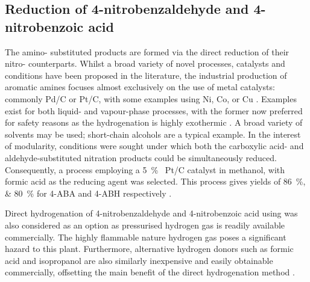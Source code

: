 
\subsection{Reduction of 4-nitrobenzaldehyde and 4-nitrobenzoic acid}

The amino- substituted products are formed via the direct reduction of their nitro- counterparts. Whilst a broad variety of novel processes, catalysts and conditions have been proposed in the literature, the industrial production of aromatic amines focuses almost exclusively on the use of metal catalysts: commonly Pd/C or Pt/C, with some examples using Ni, Co, or Cu \cite{vogt_amines_2000,cartolano_amines_2004}. Examples exist for both liquid- and vapour-phase processes, with the former now preferred for safety reasons as the hydrogenation is highly exothermic \cite{vogt_amines_2000}. A broad variety of solvents may be used; short-chain alcohols are a typical example. In the interest of modularity, conditions were sought under which both the carboxylic acid- and aldehyde-substituted nitration products could be simultaneously reduced. Consequently, a process employing a \SI{5}{\percent\ww} Pt/C catalyst in methanol, with formic acid as the reducing agent was selected. This process gives yields of \SIlist{86;80}{\percent} for 4-ABA and 4-ABH respectively \cite{gowda_catalytic_2000}.

Direct hydrogenation of 4-nitrobenzaldehyde and 4-nitrobenzoic acid using  was also considered as an option as pressurised hydrogen gas is readily available commercially. The highly flammable nature hydrogen gas poses a significant hazard to this plant. Furthermore, alternative hydrogen donors such as formic acid and isopropanol are also similarly inexpensive and easily obtainable commercially, offsetting the main benefit of the direct hydrogenation method \cite{wang_golden_nodate}. 

